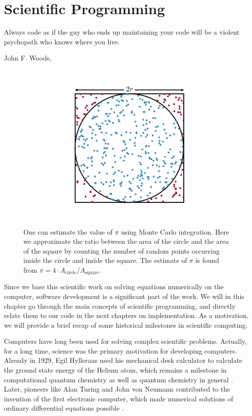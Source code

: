 \chapter{Scientific Programming} \label{chp:scientificprogramming}
\epigraph{Always code as if the guy who ends up maintaining your code will be a violent psychopath who knows where you live.}{John F. Woods, \cite{woods_usage_nodate}}
\begin{figure}[H]
	\centering
	\includegraphics[scale=0.7]{../Images/montecarlointegration2.png}
	\caption{One can estimate the value of $\pi$ using Monte Carlo integration. Here we approximate the ratio between the area of the circle and the area of the square by counting the number of random points occurring inside the circle and inside the square. The estimate of $\pi$ is found from $\pi=4\cdot A_{\text{circle}}/A_{\text{square}}$.}
	\label{fig:montecarlointegration}
\end{figure}

Since we base this scientific work on solving equations numerically on the computer, software development is a significant part of the work. We will in this chapter go through the main concepts of scientific programming, and directly relate them to our code in the next chapters on implementation. As a motivation, we will provide a brief recap of some historical milestones in scientific computing.

Computers have long been used for solving complex scientific problems. Actually, for a long time, science was the primary motivation for developing computers. Already in 1929, Egil Hylleraas used his mechanical desk calculator to calculate the ground state energy of the Helium atom, which remains a milestone in computational quantum chemistry as well as quantum chemistry in general \cite{helgaker_perspective_2000}. Later, pioneers like Alan Turing and John von Neumann contributed to the invention of the first electronic computer, which made numerical solutions of ordinary differential equations possible \cite{gustafsson_scientific_2018}. 

